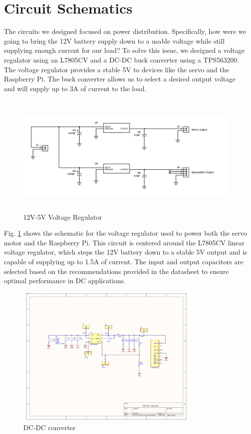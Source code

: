 \section{Circuit Schematics}

The circuits we designed focused on power distribution. Specifically, how were we going to bring the 12V battery supply down to a usable voltage while still supplying enough current for our load? To solve this issue, we designed a voltage regulator using an L7805CV and a DC-DC buck converter using a TPS563200. The voltage regulator provides a stable 5V to devices like the servo and the Raspberry Pi. The buck converter allows us to select a desired output voltage and will supply up to 3A of current to the load.
\begin{figure}[H]
    \centering
    \includegraphics[height=6cm]{Voltage Regulator.png}
     \caption{12V-5V Voltage Regulator}
    \label{fig:Voltage Regulator}
\end{figure}
Fig. \ref{fig:Voltage Regulator} shows the schematic for the voltage regulator used to power both the servo motor and the Raspberry Pi. This circuit is centered around the L7805CV linear voltage regulator, which steps the 12V battery down to a stable 5V output and is capable of supplying up to 1.5A of current. The input and output capacitors are selected based on the recommendations provided in the datasheet to ensure optimal performance in DC applications.
\begin{figure}[H]
    \centering
    \includegraphics[height=7cm]{DC-DC converter.pdf}
     \caption{DC-DC converter}
    \label{fig:DC-DC Converter}
\end{figure}

